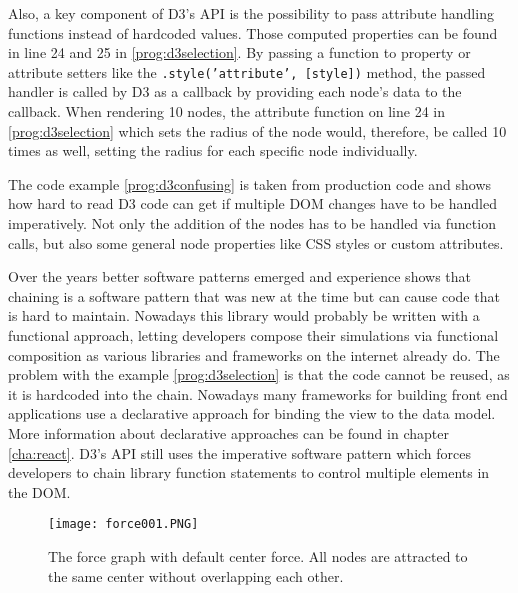 Also, a key component of D3's API is the possibility to pass attribute handling functions instead of hardcoded values. Those computed properties can be found in line 24 and 25 in \ref{prog:d3selection}. By passing a function to property or attribute setters like the \texttt{.style('attribute', [style])} method, the passed handler is called by D3 as a callback by providing each node's data to the callback. When rendering 10 nodes, the attribute function on line 24 in \ref{prog:d3selection} which sets the radius of the node would, therefore, be called 10 times as well, setting the radius for each specific node individually.

The code example \ref{prog:d3confusing} is taken from production code and shows how hard to read D3 code can get if multiple DOM changes have to be handled imperatively. Not only the addition of the nodes has to be handled via function calls, but also some general node properties like CSS styles or custom attributes.

Over the years better software patterns emerged and experience shows that chaining is a software pattern that was new at the time but can cause code that is hard to maintain. Nowadays this library would probably be written with a functional approach, letting developers compose their simulations via functional composition as various libraries and frameworks on the internet already do. The problem with the example \ref{prog:d3selection} is that the code cannot be reused, as it is hardcoded into the chain. Nowadays many frameworks for building front end applications use a declarative approach for binding the view to the data model. More information about declarative approaches can be found in chapter \ref{cha:react}. D3's API still uses the imperative software pattern which forces developers to chain library function statements to control multiple elements in the DOM.



\begin{figure}
  \centering
  \texttt{[image: force001.PNG]}
  \caption{The force graph with default center force. All nodes are attracted to the same center without overlapping each other.}
  \label{fig:force001}
\end{figure}

